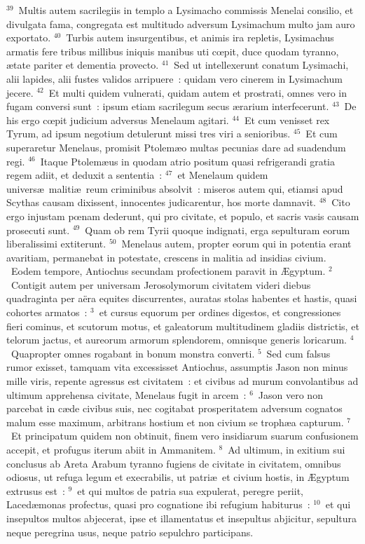 ${}^{39}$~Multis autem sacrilegiis in templo a Lysimacho commissis Menelai consilio, et divulgata fama, congregata est multitudo adversum Lysimachum multo jam auro exportato.
${}^{40}$~Turbis autem insurgentibus, et animis ira repletis, Lysimachus armatis fere tribus millibus iniquis manibus uti cœpit, duce quodam tyranno, \ae tate pariter et dementia provecto.
${}^{41}$~Sed ut intellexerunt conatum Lysimachi, alii lapides, alii fustes validos arripuere~: quidam vero cinerem in Lysimachum jecere.
${}^{42}$~Et multi quidem vulnerati, quidam autem et prostrati, omnes vero in fugam conversi sunt~: ipsum etiam sacrilegum secus \ae rarium interfecerunt.
${}^{43}$~De his ergo cœpit judicium adversus Menelaum agitari.
${}^{44}$~Et cum venisset rex Tyrum, ad ipsum negotium detulerunt missi tres viri a senioribus.
${}^{45}$~Et cum superaretur Menelaus, promisit Ptolem\ae o multas pecunias dare ad suadendum regi.
${}^{46}$~Itaque Ptolem\ae us in quodam atrio positum quasi refrigerandi gratia regem adiit, et deduxit a sententia~:
${}^{47}$~et Menelaum quidem univers\ae\ maliti\ae\ reum criminibus absolvit~: miseros autem qui, etiamsi apud Scythas causam dixissent, innocentes judicarentur, hos morte damnavit.
${}^{48}$~Cito ergo injustam pœnam dederunt, qui pro civitate, et populo, et sacris vasis causam prosecuti sunt.
${}^{49}$~Quam ob rem Tyrii quoque indignati, erga sepulturam eorum liberalissimi extiterunt.
${}^{50}$~Menelaus autem, propter eorum qui in potentia erant avaritiam, permanebat in potestate, crescens in malitia ad insidias civium.
~\lettrine[lines=10,image=true,loversize=0.05,lraise=-0.03]{E}{}odem tempore, Antiochus secundam profectionem paravit in \AE gyptum.
${}^{2}$~Contigit autem per universam Jerosolymorum civitatem videri diebus quadraginta per a\"era equites discurrentes, auratas stolas habentes et hastis, quasi cohortes armatos~:
${}^{3}$~et cursus equorum per ordines digestos, et congressiones fieri cominus, et scutorum motus, et galeatorum multitudinem gladiis districtis, et telorum jactus, et aureorum armorum splendorem, omnisque generis loricarum.
${}^{4}$~Quapropter omnes rogabant in bonum monstra converti.
${}^{5}$~Sed cum falsus rumor exisset, tamquam vita excessisset Antiochus, assumptis Jason non minus mille viris, repente agressus est civitatem~: et civibus ad murum convolantibus ad ultimum apprehensa civitate, Menelaus fugit in arcem~:
${}^{6}$~Jason vero non parcebat in c\ae de civibus suis, nec cogitabat prosperitatem adversum cognatos malum esse maximum, arbitrans hostium et non civium se troph\ae a capturum.
${}^{7}$~Et principatum quidem non obtinuit, finem vero insidiarum suarum confusionem accepit, et profugus iterum abiit in Ammanitem.
${}^{8}$~Ad ultimum, in exitium sui conclusus ab Areta Arabum tyranno fugiens de civitate in civitatem, omnibus odiosus, ut refuga legum et execrabilis, ut patri\ae\ et civium hostis, in \AE gyptum extrusus est~:
${}^{9}$~et qui multos de patria sua expulerat, peregre periit, Laced\ae monas profectus, quasi pro cognatione ibi refugium habiturus~:
${}^{10}$~et qui insepultos multos abjecerat, ipse et illamentatus et insepultus abjicitur, sepultura neque peregrina usus, neque patrio sepulchro participans.


